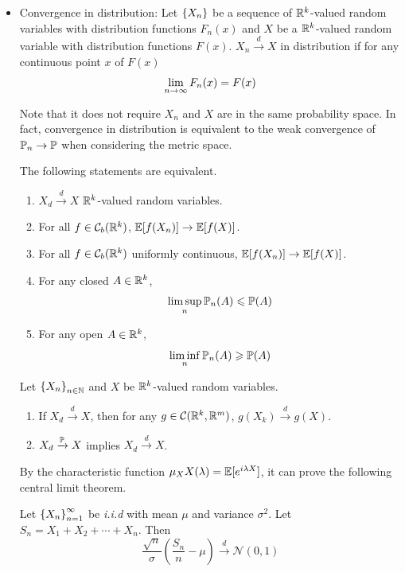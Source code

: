 \documentclass[a4paper,12pt]{article}
\begin{document}
\begin{itemize}
  \item Convergence in distribution: Let $\left\{X_n\right\}$ be a sequence of $\mathbb{R}^k$-valued random variables with distribution functions $F_n(x)$ and $X $ be a $\mathbb{R}^k$-valued random variable with distribution functions $F(x)$. $X_n \xrightarrow{d}X$ in distribution if for any continuous point $x$ of $F(x)$
  \begin{equation*}
    \lim_{n\rightarrow \infty} F_n(x) = F(x)
  \end{equation*}
  \begin{rmk}
    Note that it does not require $X_n$ and $X$ are in the same probability space. In fact, convergence in distribution is equivalent to the weak convergence of $\mathbb{P}_n \rightarrow \mathbb{P}$ when considering the metric space.
  \end{rmk}
  \begin{thm}
    The following statements are equivalent.
    \begin{enumerate}[label=(\arabic*)]
      \item $X_d \xrightarrow{d}X$ $\mathbb{R}^k$-valued random variables.
      \item For all $f \in \mathcal{C}_b(\mathbb{R}^k)$, $\mathbb{E}[f(X_n)] \rightarrow \mathbb{E}[f(X)]$.
      \item For all $f \in \mathcal{C}_b(\mathbb{R}^k)$ uniformly continuous, $\mathbb{E}[f(X_n)] \rightarrow \mathbb{E}[f(X)]$.
      \item For any closed $A \in \mathbb{R}^k$, 
      \begin{equation*}
        \limsup_n \mathbb{P}_n(A) \leqslant \mathbb{P}(A)
      \end{equation*}
      \item For any open $A \in \mathbb{R}^k$, 
      \begin{equation*}
        \liminf_n \mathbb{P}_n(A) \geqslant \mathbb{P}(A)
      \end{equation*}
    \end{enumerate}
  \end{thm}
  \begin{thm}
    Let $\left\{X_n\right\}_{n\in \mathbb{N}}$ and $X$ be $\mathbb{R}^k$-valued random variables.
    \begin{enumerate}[label=(\arabic*)]
      \item If $X_d \xrightarrow{d}X$, then for any $g \in \mathcal{C}(\mathbb{R}^k, \mathbb{R}^m)$, $g(X_k) \xrightarrow{d} g(X)$.
      \item $X_d \xrightarrow{\mathbb{P}}X$ implies $X_d \xrightarrow{d}X$.
    \end{enumerate}
  \end{thm}
  By the characteristic function $\phi_X(\lambda) = \E[e^{i\lambda X}]$, it can prove the following central limit theorem.
  \begin{thm}
    Let $\left\{X_n\right\}_{n=1}^{\infty}$ be \emph{i.i.d} with mean $\mu$ and variance $\sigma^2$. Let $S_n = X_1 + X_2 + \cdots + X_n$. Then
    \begin{equation*}
      \frac{\sqrt{n}}{\sigma}(\frac{S_n}{n}-\mu) \xrightarrow{d} \mathcal{N}(0,1)
    \end{equation*}
  \end{thm}


\end{itemize}
\end{document}

